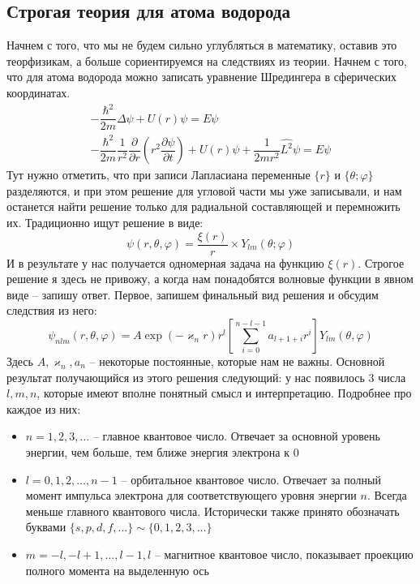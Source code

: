 \documentclass[12pt]{article}
\begin{document}
\subsection{Строгая теория для атома водорода}
Начнем с того, что мы не будем сильно углубляться в математику, оставив это теорфизикам, а больше сориентируемся на следствиях из теории. Начнем с того, что для атома водорода можно записать уравнение Шредингера в сферических координатах. 
\begin{gather}
\label{eq:sem_06_schrodinger_atom}
    -\dfrac{\hbar^2}{2m}\Delta\psi + U(r)\psi = E\psi\\
    -\dfrac{\hbar^2}{2m}\dfrac{1}{r^2}\dfrac{\partial}{\partial r}\left( r^2 \dfrac{\partial\psi}{\partial t}\right) + U(r)\psi +\dfrac{1}{2mr^2}\hat{L^2}\psi = E\psi
\end{gather}
Тут нужно отметить, что при записи Лапласиана переменные $\{r\}$ и $\{\theta; \varphi\}$ разделяются, и при этом решение для угловой части мы уже записывали, и нам останется найти решение только для радиальной составляющей и перемножить их. Традиционно ищут решение в виде:
\begin{equation*}
    \psi(r, \theta, \varphi) = \dfrac{\xi(r)}{r}\times Y_{lm}(\theta; \varphi)
\end{equation*}
И в результате у нас получается одномерная задача на функцию $\xi(r)$. Строгое решение я здесь не привожу, а когда нам понадобятся волновые функции в явном виде -- запишу ответ.
Первое, запишем финальный вид решения и обсудим следствия из него:
\begin{equation*}
    \psi_{nlm}(r, \theta, \varphi) = A \exp{(-\varkappa_n r)}r^l\left[\sum\limits_{i=0}^{n-l-1}a_{l+1+i}r^i\right]Y_{lm}(\theta, \varphi)
\end{equation*}
Здесь $A, \varkappa_n, a_n$ -- некоторые постоянные, которые нам не важны. Основной результат получающийся из этого решения следующий: у нас появилось 3 числа $l,m,n$, которые имеют вполне понятный смысл и интерпретацию. Подробнее про каждое из них:
\begin{itemize}
    \item $n = 1, 2, 3, \dots $ -- главное квантовое число. Отвечает за основной уровень энергии, чем больше, тем ближе энергия электрона к 0
    \item $l = 0, 1, 2, \dots, n-1$ -- орбитальное квантовое число. Отвечает за полный момент импульса электрона для соответствующего уровня энергии $n$. Всегда меньше главного квантового числа. Исторически также принято обозначать буквами $\{s,p,d,f, \dots \} \sim \{0,1,2,3, \dots\}$
    \item $m = -l, -l+1, \dots, l-1, l$ -- магнитное квантовое число, показывает проекцию полного момента на выделенную ось
\end{itemize}
\end{document}
